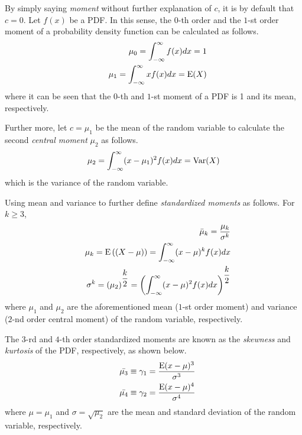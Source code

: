 By simply saying \textit{moment} without further explanation of $c$, it is by default that $c=0$. Let $f(x)$ be a PDF. In this sense, the $0$-th order and the $1$-st order moment of a probability density function can be calculated as follows.
\begin{eqnarray}
  && \mu_0 = \int_{-\infty}^{\infty}f(x)dx = 1 \nonumber \\
  && \mu_1 = \int_{-\infty}^{\infty}xf(x)dx = \textup{E}(X) \nonumber
\end{eqnarray} 
where it can be seen that the $0$-th and $1$-st moment of a PDF is 1 and its mean, respectively.

Further more, let $c=\mu_1$ be the mean of the random variable to calculate the second \textit{central moment} $\mu_2$ as follows.
\begin{eqnarray}
  \mu_2 = \int_{-\infty}^{\infty}(x-\mu_1)^2f(x)dx = \textup{Var}(X) \nonumber
\end{eqnarray} 
which is the variance of the random variable.

Using mean and variance to further define \textit{standardized moments} as follows. For $k\geq 3$,
\begin{eqnarray}
  && \bar{\mu}_k = \dfrac{\mu_k}{\sigma^k} \nonumber \\
  && \mu_k = \textup{E}\left((X-\mu)\right) = \int_{-\infty}^{\infty}(x-\mu)^kf(x)dx \nonumber \\
  && \sigma^k = \left(\mu_2\right)^{\dfrac{k}{2}} = \left(\int_{-\infty}^{\infty}(x-\mu)^2f(x)dx\right)^{\dfrac{k}{2}} \nonumber
\end{eqnarray}
where $\mu_1$ and $\mu_2$ are the aforementioned mean ($1$-st order moment) and variance ($2$-nd order central moment) of the random variable, respectively.

The $3$-rd and $4$-th order standardized moments are known as the \textit{skewness} and \textit{kurtosis} of the PDF, respectively, as shown below.
\begin{eqnarray}
  && \bar{\mu_3} \equiv \gamma_1 = \dfrac{\textup{E}(x-\mu)^3}{\sigma^3} \nonumber \\
  && \bar{\mu_4} \equiv \gamma_2 = \dfrac{\textup{E}(x-\mu)^4}{\sigma^4} \nonumber
\end{eqnarray}
where $\mu=\mu_1$ and $\sigma = \sqrt{\mu_2}$ are the mean and standard deviation of the random variable, respectively. 

